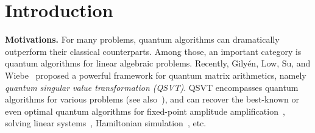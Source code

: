 \documentclass[journal]{IEEEtran}
\begin{document}
\section{Introduction}
\noindent
\textbf{Motivations.}
For many problems, quantum algorithms can dramatically outperform their classical counterparts. Among those, an important category is quantum algorithms for linear algebraic problems. Recently, Gily{\'e}n, Low, Su, and Wiebe~\cite{gilyen2019singular} proposed a powerful framework for quantum matrix arithmetics, namely \emph{quantum singular value transformation (QSVT)}. QSVT encompasses quantum algorithms for various problems (see also~\cite{martyn2021grand}), and can recover the best-known or even optimal quantum algorithms for fixed-point amplitude amplification~\cite{grover2005fixed,tulsi2006new,aaronson2012quantum,yoder2014fixed}, solving linear systems~\cite{harrow2009quantum,ambainis2012variable,childs2017,chakraborty2019linear}, Hamiltonian simulation~\cite{low2017optimal,low2019hamiltonian}, etc.
\end{document}
